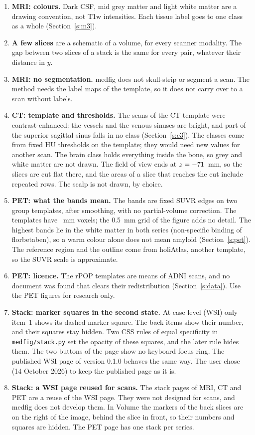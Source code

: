 \documentclass[10pt,a4paper]{article}
\newcommand{\code}[1]{\texttt{#1}}
\begin{document}
\begin{enumerate}
mirror image: the left structures lie on opposite sides. A host page that shows both should say so, or set
\code{orientation} of the scanner modalities to \code{neurological}.
\item \textbf{MRI: colours.} Dark CSF, mid grey matter and light white matter are a drawing convention, not T1w intensities.
Each tissue label goes to one class as a whole (Section~\ref{s:m3}).
\item \textbf{A few slices} are a schematic of a volume, for every scanner modality. The gap between two slices of a stack is
the same for every pair, whatever their distance in $y$.
\item \textbf{MRI: no segmentation.} medfig does not skull-strip or segment a scan. The method needs the label maps of the template,
so it does not carry over to a scan without labels.
\item \textbf{CT: template and thresholds.} The scans of the CT template were contrast-enhanced: the vessels and the venous
sinuses are bright, and part of the superior sagittal sinus falls in no class (Section~\ref{s:c3}). The classes come from fixed
HU thresholds on the template; they would need new values for another scan. The brain class holds everything inside the bone,
so grey and white matter are not drawn. The field of view ends at $z=-71$~mm, so the slices are cut flat there, and the
areas of a slice that reaches the cut include repeated rows. The scalp is not drawn, by choice.
\item \textbf{PET: what the bands mean.} The bands are fixed SUVR edges on two group templates, after smoothing, with no
partial-volume correction. The templates have \petNativeVs~mm voxels; the 0.5~mm grid of the figure adds no detail. The highest
bands lie in the white matter in both series (non-specific binding of florbetaben), so a warm colour alone does not mean amyloid
(Section~\ref{s:pet}). The reference region and the outline come from holiAtlas, another template, so the SUVR scale is
approximate.
\item \textbf{PET: licence.} The rPOP templates are means of ADNI scans, and no document was found that clears their
redistribution (Section~\ref{s:data}). Use the PET figures for research only.
\item\label{l:squares} \textbf{Stack: marker squares in the second state.} At case level (WSI) only item~1 shows its dashed marker
square. The back items show their number, and their squares stay hidden. Two CSS rules of equal specificity in
\code{medfig/stack.py} set the opacity of these squares, and the later rule hides them. The two buttons of the page show no
keyboard focus ring. The published WSI page of version 0.1.0 behaves the same way. The user chose (14 October 2026) to keep
the published page as it is.
\item\label{l:stackscan} \textbf{Stack: a WSI page reused for scans.} The stack pages of MRI, CT and PET are a reuse of the WSI
page. They were not designed for scans, and medfig does not develop them. In Volume the markers of the back slices are on the
right of the image, behind the slice in front, so their numbers and squares are hidden. The PET page has one stack per series.
\end{enumerate}
\end{document}
